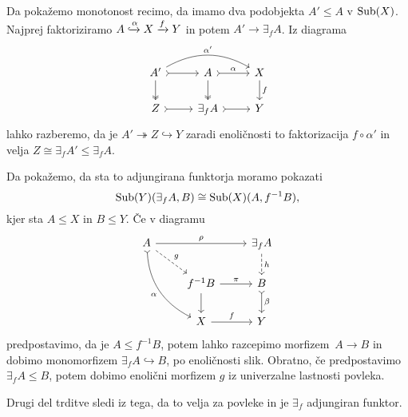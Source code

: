 \documentclass[../kategoricna_logika.tex]{subfiles}
\begin{document}
\begin{dokaz}
  Da pokažemo monotonost recimo, da imamo dva podobjekta $A' \leq A$ v
  $\operatorname{Sub}(X)$.  Najprej faktoriziramo
  $A \xhookrightarrow{\alpha} X \xrightarrow{f} Y$ in potem
  $A' \to \exists_f A$.  Iz diagrama
  \begin{equation*}
    \begin{tikzcd}
      A' \ar[d, two heads] \ar[r, tail] \ar[rr, bend left, "\alpha'"]
      &
      A \ar[d, two heads] \ar[r, tail, "\alpha"] & X \ar[d, "f"] \\
      Z \ar[r, tail] & \exists_f A \ar[r, tail] & Y
    \end{tikzcd}
  \end{equation*}
  lahko razberemo, da je $A' \twoheadrightarrow Z \hookrightarrow Y$
  zaradi enoličnosti to faktorizacija $f \circ \alpha'$ in velja
  $Z \cong \exists_f A' \leq \exists_f A$.

  Da pokažemo, da sta to adjungirana funktorja moramo pokazati
  $$\operatorname{Sub}(Y)(\exists_f A, B) \cong \operatorname{Sub}(X)(A, f^{-1}B),$$
  kjer sta $A \leq X$ in $B \leq Y$. Če v diagramu
  \begin{equation*}
    \begin{tikzcd}
      A \ar[ddr, bend right, tail, "\alpha"'] \ar[dr, dashed, "g"]
      \ar[rr, "\rho"] & &
      \exists_f A \ar[d, dashed, "h"] \\
      & f^{-1}B \ar[d] \ar[r, "\pi"] & B \ar[d, tail, "\beta"] \\
      & X \ar[r, "f"] & Y
    \end{tikzcd}
  \end{equation*}
  predpostavimo, da je $A \leq f^{-1}B$, potem lahko
  razcepimo morfizem~$A \to B$ in dobimo monomorfizem
  $\exists_f A \hookrightarrow B$, po enoličnosti slik.  Obratno, če
  predpostavimo $\exists_fA \leq B$, potem dobimo enolični
  morfizem $g$ iz univerzalne lastnosti povleka.

  Drugi del trditve sledi iz tega, da to velja za povleke in je
  $\exists_f$ adjungiran funktor.
\end{dokaz}
%
\end{document}
